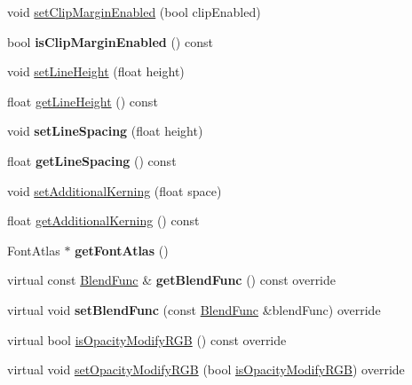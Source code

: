 \begin{DoxyCompactItemize}
\item 
void \hyperlink{classLabel_ae882e2499324c73c9852fb573aa0de5c}{set\+Clip\+Margin\+Enabled} (bool clip\+Enabled)
\item 
\mbox{\label{classLabel_a9ec18e7fdfd25b1b83d868dace902ce6}} 
bool {\bfseries is\+Clip\+Margin\+Enabled} () const
\item 
void \hyperlink{classLabel_acb0bd4b5aa05360a85f18def21cd7e4d}{set\+Line\+Height} (float height)
\item 
float \hyperlink{classLabel_afec75d9e7948756cee3ed98c4a94b6b4}{get\+Line\+Height} () const
\item 
\mbox{\label{classLabel_a2b57d1ea1eed05465a8e90de90381ecb}} 
void {\bfseries set\+Line\+Spacing} (float height)
\item 
\mbox{\label{classLabel_ab2917c3dc5d5106baef1ed66dded37ce}} 
float {\bfseries get\+Line\+Spacing} () const
\item 
void \hyperlink{classLabel_aef8a7f1ece5bb313fce798b1538640d7}{set\+Additional\+Kerning} (float space)
\item 
float \hyperlink{classLabel_a4dc8b796743eddc146f8f248b08a7db6}{get\+Additional\+Kerning} () const
\item 
\mbox{\label{classLabel_a0f3c9daca925dfa753e1e963e6923aa8}} 
Font\+Atlas $\ast$ {\bfseries get\+Font\+Atlas} ()
\item 
\mbox{\label{classLabel_adf030b51b2614a1bc3251763c61759da}} 
virtual const \hyperlink{structBlendFunc}{Blend\+Func} \& {\bfseries get\+Blend\+Func} () const override
\item 
\mbox{\label{classLabel_a6553a6c1a080639940c3f875ddafe709}} 
virtual void {\bfseries set\+Blend\+Func} (const \hyperlink{structBlendFunc}{Blend\+Func} \&blend\+Func) override
\item 
virtual bool \hyperlink{classLabel_ade8bf273e99add4d4861697d469f6d89}{is\+Opacity\+Modify\+R\+GB} () const override
\item 
virtual void \hyperlink{classLabel_ab548565b1faa8449ced97d96a591e955}{set\+Opacity\+Modify\+R\+GB} (bool \hyperlink{classLabel_ade8bf273e99add4d4861697d469f6d89}{is\+Opacity\+Modify\+R\+GB}) override
\item 

\end{DoxyCompactItemize}
